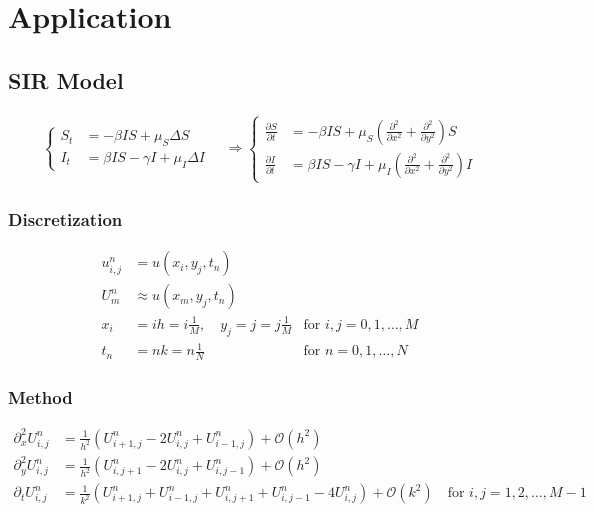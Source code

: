 \chapter{Application}

\section{SIR Model}
\begin{align}
  \begin{cases}
    S_t & = -\beta IS + \mu_S \Delta S           \\
    I_t & = \beta IS - \gamma I + \mu_I \Delta I
  \end{cases}
  \quad \Longrightarrow
  \begin{cases}
    \frac{\partial S}{\partial t} & = -\beta IS + \mu_S \left(\frac{\partial^2 }{\partial x^2} + \frac{\partial^2 }{\partial y^2}\right) S           \\
    \frac{\partial I}{\partial t} & = \beta IS - \gamma I + \mu_I \left(\frac{\partial^2 }{\partial x^2} + \frac{\partial^2 }{\partial y^2}\right) I
  \end{cases}
\end{align}

\subsection{Discretization}

\begin{align*}
    u_{i,j}^n & = u(x_i,y_j,t_n) \tag{exact} \\
    U_m^n & \approx u(x_m,y_j,t_n) \tag{approx} \\
    x_i & = ih = i\frac{1}{M}, \quad y_j = j = j\frac{1}{M} & \text{for } i,j = 0,1,\ldots,M \\
    t_n & = nk = n\frac{1}{N} & \text{for } n = 0,1,\ldots,N
\end{align*}

\subsection{Method}
\begin{align*}
    \partial_x^2 U_{i,j}^n & = \frac{1}{h^2} \left(U_{i+1,j}^n - 2U_{i,j}^n + U_{i-1,j}^n \right) + \mathcal{O}(h^2) \\
    \partial_y^2 U_{i,j}^n & = \frac{1}{h^2} \left(U_{i,j+1}^n - 2U_{i,j}^n + U_{i,j-1}^n\right) + \mathcal{O}(h^2) \\
    \partial_t U_{i,j}^n & = \frac{1}{k^2} \left(U_{i+1,j}^n + U_{i-1,j}^n + U_{i,j+1}^n + U_{i,j-1}^n - 4U_{i,j}^n\right) + \mathcal{O}(k^2) \quad \text{for } i,j = 1,2,\ldots,M-1
\end{align*}







